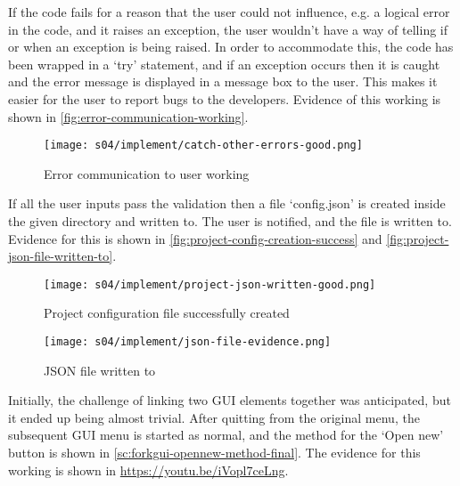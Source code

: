         If the code fails for a reason that the user could not influence, e.g. a logical error in the code, and it raises an exception, the user wouldn't have a way of telling if or when an exception is being raised. 
        In order to accommodate this, the code has been wrapped in a `try' statement, and if an exception occurs then it is caught and the error message is displayed in a message box to the user. 
        This makes it easier for the user to report bugs to the developers.
        Evidence of this working is shown in \autoref{fig:error-communication-working}.

        \begin{figure}[!ht]
            \centering
            \texttt{[image: s04/implement/catch-other-errors-good.png]}
            \caption{Error communication to user working}
            \label{fig:error-communication-working}
        \end{figure}

        If all the user inputs pass the validation then a file `config.json' is created inside the given directory and written to. The user is notified, and the file is written to. Evidence for this is shown in \autoref{fig:project-config-creation-success} and \autoref{fig:project-json-file-written-to}. 



        \begin{figure}[!ht]
            \centering
            \texttt{[image: s04/implement/project-json-written-good.png]}
            \caption{Project configuration file successfully created}
            \label{fig:project-config-creation-success}
        \end{figure}

        \begin{figure}[!ht]
            \centering
            \texttt{[image: s04/implement/json-file-evidence.png]}
            \caption{JSON file written to}
            \label{fig:project-json-file-written-to}
        \end{figure}

        Initially, the challenge of linking two GUI elements together was anticipated, but it ended up being almost trivial. After quitting from the original menu, the subsequent GUI menu is started as normal, and the method for the `Open new' button is shown in \autoref{sc:forkgui-opennew-method-final}. The evidence for this working is shown in \url{https://youtu.be/iVopl7ceLng}.

